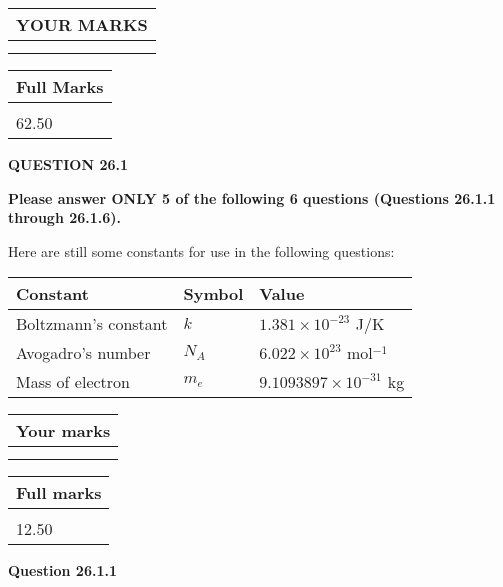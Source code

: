 \documentclass[12pt]{article}
\begin{document}
 
   
   
  
\vspace{0.2in}
  
\noindent\begin{tabular}{|l|}
\hline
 YOUR MARKS  \\
\hline
 \\ 
 \\ 
\hline
\end{tabular}
\hspace{0.05in} \begin{tabular}{|l|}
\hline
 Full Marks  \\
\hline
 \\ 
62.50 \\
\hline
\end{tabular}
{\textbf{\Large{QUESTION
26.1 
}}}
  
  
 
{\textbf{\Large{Please answer ONLY
5 of the following
6 questions (Questions
26.1.1 through
26.1.6). }}}
 
Here are still some constants for use in the following questions:
 
 
\noindent\begin{tabular}{|l|l|l|}
\hline
Constant & Symbol & Value \\
\hline
 
Boltzmann's constant &
$k$ &
 $ 1.381 \times 10^{-23} $
J/K \\
\hline
 
Avogadro's number &
$N_A$ &
 $ 6.022 \times 10^{23} $
mol$^{-1}$ \\
\hline
 
Mass of electron &
$m_e$ &
 $ 9.1093897 \times 10^{-31} $
kg \\
\hline
 
\end{tabular}
 
  
\vspace{0.2in}
  
         \begin{tabular}{|l|}
\hline
 Your marks  \\
\hline
 \\ 
 \\ 
\hline
\end{tabular}
\hspace{0.05in} \begin{tabular}{|l|}
\hline
 Full marks  \\
\hline
 \\ 
12.50 \\
\hline
\end{tabular}
{\textbf{\Large{Question
26.1.1 
}}}
  
\end{document}
